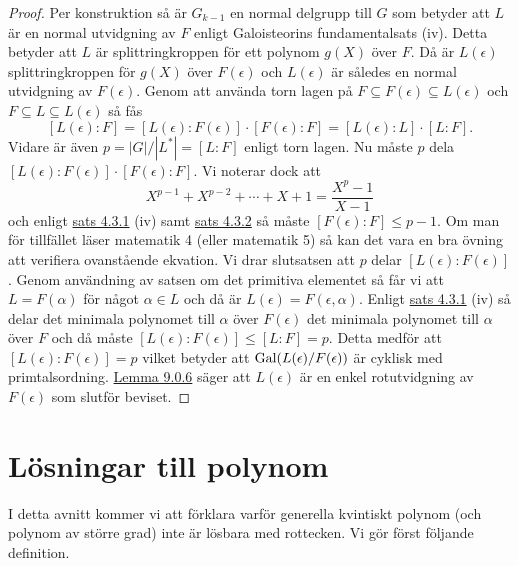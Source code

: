 \documentclass{article}
\newcommand{\gal}[0]{\textnormal{Gal}}
\theoremstyle{definition}
\begin{document}
\begin{proof}
  Per konstruktion så är $G_{k-1}$ en normal delgrupp till $G$ som betyder att $L$ är en normal utvidgning av $F$ enligt 
  Galoisteorins fundamentalsats (iv). Detta betyder att $L$ är splittringkroppen för ett polynom $g(X)$ över $F$. Då är $L(\epsilon)$
  splittringkroppen för $g(X)$ över $F(\epsilon)$ och $L(\epsilon)$ är således en normal utvidgning av $F(\epsilon)$. Genom 
  att använda torn lagen på $F \subseteq F(\epsilon) \subseteq L(\epsilon)$ och $F \subseteq L \subseteq L(\epsilon)$ så fås 
  \[ [L(\epsilon):F] = [L(\epsilon): F(\epsilon)] \cdot [F(\epsilon): F] = [L(\epsilon): L] \cdot [L:F]. \]
  Vidare är även $p = |G|/|L^*| = [L:F]$ enligt torn lagen. Nu måste $p$ dela $[L(\epsilon): F(\epsilon)] \cdot [F(\epsilon): F]$.
  Vi noterar dock att 
  \[X^{p-1} + X^{p-2} + \cdots + X + 1 = \frac{X^p - 1}{X - 1}\]
  och enligt \hyperlink{minpol}{sats 4.3.1} (iv) samt \hyperlink{5.3.2}{sats 4.3.2} så måste $[F(\epsilon): F] \leq p-1$. Om man för tillfället läser 
  matematik 4 (eller matematik 5) så kan det vara en bra övning att verifiera ovanstående ekvation. 
  Vi drar slutsatsen att $p$ delar $[L(\epsilon): F(\epsilon)]$.
  Genom användning av satsen om det primitiva elementet så får vi att $L = F(\alpha)$ för något $\alpha \in L$ och då är $L(\epsilon) = F(\epsilon, \alpha)$.
  Enligt \hyperlink{minpol}{sats 4.3.1} (iv) så delar det minimala polynomet till $\alpha$ över $F(\epsilon)$ det minimala polynomet till $\alpha$
  över $F$ och då måste $[L(\epsilon):F(\epsilon)] \leq [L:F] = p$. Detta medför att $[L(\epsilon):F(\epsilon)] = p$ vilket betyder att 
  $\gal(L(\epsilon)/F(\epsilon))$ är cyklisk med primtalsordning. \hyperlink{lemma10.0.6}{Lemma 9.0.6} säger att 
  $L(\epsilon)$ är en enkel rotutvidgning av $F(\epsilon)$ som slutför beviset.
\end{proof}

\section{Lösningar till polynom}
I detta avnitt kommer vi att förklara varför generella kvintiskt polynom (och polynom av större grad) inte är lösbara med rottecken. 
Vi gör först följande definition.  
\end{document}
